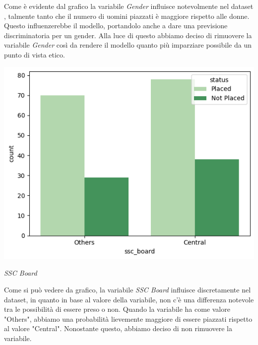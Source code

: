 \documentclass[12pt]{article}
\begin{document}
Come è evidente dal grafico la variabile \textit{Gender} influisce notevolmente nel dataset , talmente tanto che il numero di uomini piazzati è maggiore rispetto alle donne. Questo influenzerebbe il modello, portandolo anche a dare una previsione discriminatoria per un gender.
Alla luce di questo abbiamo deciso di rimuovere la variabile \textit{Gender} così da rendere il modello quanto più imparziare possibile da un punto di vista etico.

\begin{center}

    \includegraphics[scale=0.5]{sscboard.png}

    \textit{SSC Board}
\end{center}
Come si può vedere da grafico, la variabile \textit{SSC Board} influisce discretamente nel dataset, in quanto in base al valore della variabile, non c'è una differenza notevole tra le possibilità di essere preso o non. Quando la variabile ha come valore "Others", abbiamo una probabilità lievemente maggiore di essere piazzati rispetto al valore "Central".
Nonostante questo, abbiamo deciso di non rimuovere la variabile.
\end{document}
